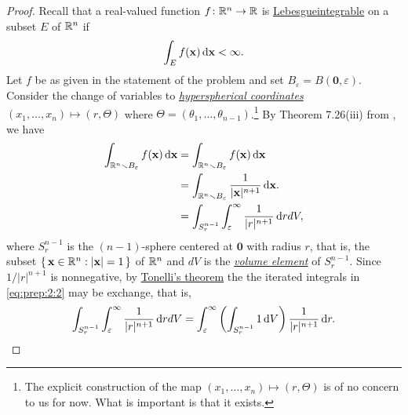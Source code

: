 \begin{proof}
Recall that a real-valued function $f\colon\mathbb{R}^n\to\mathbb{R}$ is
\href{https://en.wikipedia.org/wiki/Fubini's_theorem#Tonelli.27s_theorem_for_non-negative_functions}{Lebesgueintegrable}
on a subset $E$ of $\mathbb{R}^n$ if
\begin{equation}
\label{eq:prep:2:1}
\int_E f(\mathbf{x})\mathop{}\!\mathrm{d}\mathbf{x}<\infty.
\end{equation}
Let $f$ be as given in the statement of the problem and set
$B_\varepsilon= B(\mathbf{0},\varepsilon)$. Consider
the change of variables to
\href{https://en.wikipedia.org/wiki/N-sphere#Spherical_coordinates}{\emph{hyperspherical
    coordinates}} $(x_1,\dotsc,x_n)\mapsto(r,\Theta)$ where
$\Theta=(\theta_1,\dotsc,\theta_{n-1})$.\footnote{The explicit construction
  of the map $(x_1,\dotsc,x_n)\mapsto(r,\Theta)$ is of no concern to us for
  now. What is important is that it exists.} By Theorem 7.26(iii) from
\cite[Ch.\@ 7, p.\@ 123]{rudin-2}, we have
\begin{equation}
\label{eq:prep:2:2}
\begin{aligned}
\int_{\mathbb{R}^n\smallsetminus B_\varepsilon}f(\mathbf{x})\mathop{}\!\mathrm{d}\mathbf{x}
&=\int_{\mathbb{R}^n\smallsetminus B_\varepsilon} f(\mathbf{x})\mathop{}\!\mathrm{d}\mathbf{x}\\
&=\int_{\mathbb{R}^n\smallsetminus
  B_\varepsilon}\frac{1}{|\mathbf{x}|^{n+1}}\mathop{}\!\mathrm{d}\mathbf{x}.\\
&=\int_{S^{n-1}_r}\int_\varepsilon^\infty\frac{1}{|r|^{n+1}} \mathop{}\!\mathrm{d} r dV,
\end{aligned}
\end{equation}
where $S_r^{n-1}$ is the $(n-1)$-sphere centered at $\mathbf{0}$ with
radius $r$, that is, the subset $\left\{\,\mathbf{x}\in\mathbb{R}^n:|\mathbf{x}|=1\,\right\}$
of $\mathbb{R}^n$ and $dV$ is the
\href{https://en.wikipedia.org/wiki/Volume_element}{\emph{volume element}}
of $S_r^{n-1}$. Since $1/|r|^{n+1}$ is nonnegative, by
\href{https://en.wikipedia.org/wiki/Fubini's_theorem#Tonelli.27s_theorem}{Tonelli's
  theorem} the the iterated integrals in \eqref{eq:prep:2:2} may be
exchange, that is,
\begin{equation}
  \label{eq:prep:2:3}
\int_{S^{n-1}_r}\int_\varepsilon^\infty\frac{1}{|r|^{n+1}} \mathop{}\!\mathrm{d} r dV=
\int_\varepsilon^\infty\left(\int_{S_r^{n-1}}1\mathop{}\!\mathrm{d}
  V\right)\frac{1}{|r|^{n+1}}\mathop{}\!\mathrm{d} r.
\end{equation}


\end{proof}
